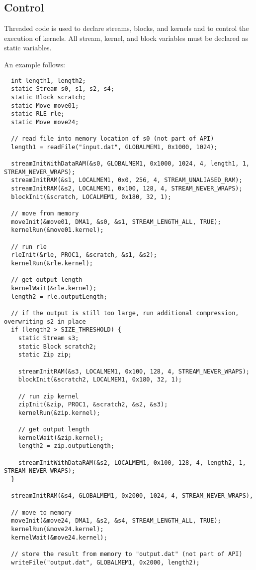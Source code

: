 \subsection{Control}
\label{sec:control}

Threaded code is used to declare streams, blocks, and kernels and to
control the execution of kernels. All stream, kernel, and block
variables must be declared as static variables.

An example follows:
{\small
\begin{verbatim}
  int length1, length2;
  static Stream s0, s1, s2, s4;
  static Block scratch;
  static Move move01;
  static RLE rle;
  static Move move24;

  // read file into memory location of s0 (not part of API)
  length1 = readFile("input.dat", GLOBALMEM1, 0x1000, 1024);

  streamInitWithDataRAM(&s0, GLOBALMEM1, 0x1000, 1024, 4, length1, 1, STREAM_NEVER_WRAPS);
  streamInitRAM(&s1, LOCALMEM1, 0x0, 256, 4, STREAM_UNALIASED_RAM);
  streamInitRAM(&s2, LOCALMEM1, 0x100, 128, 4, STREAM_NEVER_WRAPS);
  blockInit(&scratch, LOCALMEM1, 0x180, 32, 1);

  // move from memory
  moveInit(&move01, DMA1, &s0, &s1, STREAM_LENGTH_ALL, TRUE);
  kernelRun(&move01.kernel);
  
  // run rle
  rleInit(&rle, PROC1, &scratch, &s1, &s2);
  kernelRun(&rle.kernel);

  // get output length
  kernelWait(&rle.kernel);
  length2 = rle.outputLength;
  
  // if the output is still too large, run additional compression, overwriting s2 in place
  if (length2 > SIZE_THRESHOLD) {
    static Stream s3;
    static Block scratch2;
    static Zip zip;

    streamInitRAM(&s3, LOCALMEM1, 0x100, 128, 4, STREAM_NEVER_WRAPS);
    blockInit(&scratch2, LOCALMEM1, 0x180, 32, 1);

    // run zip kernel
    zipInit(&zip, PROC1, &scratch2, &s2, &s3);
    kernelRun(&zip.kernel);
    
    // get output length
    kernelWait(&zip.kernel);
    length2 = zip.outputLength;

    streamInitWithDataRAM(&s2, LOCALMEM1, 0x100, 128, 4, length2, 1, STREAM_NEVER_WRAPS);
  }
  
  streamInitRAM(&s4, GLOBALMEM1, 0x2000, 1024, 4, STREAM_NEVER_WRAPS),
  
  // move to memory
  moveInit(&move24, DMA1, &s2, &s4, STREAM_LENGTH_ALL, TRUE);
  kernelRun(&move24.kernel);
  kernelWait(&move24.kernel);

  // store the result from memory to "output.dat" (not part of API)
  writeFile("output.dat", GLOBALMEM1, 0x2000, length2); \end{verbatim}}

